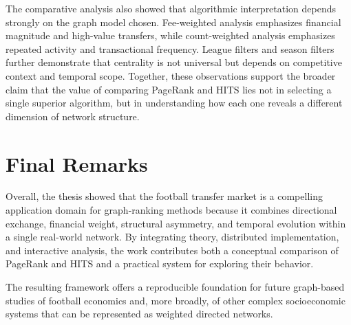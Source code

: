 The comparative analysis also showed that algorithmic interpretation depends strongly on the graph model chosen. Fee-weighted analysis emphasizes financial magnitude and high-value transfers, while count-weighted analysis emphasizes repeated activity and transactional frequency. League filters and season filters further demonstrate that centrality is not universal but depends on competitive context and temporal scope. Together, these observations support the broader claim that the value of comparing PageRank and HITS lies not in selecting a single superior algorithm, but in understanding how each one reveals a different dimension of network structure.

\section{Final Remarks}
\label{sec:conclusion_final}

Overall, the thesis showed that the football transfer market is a compelling application domain for graph-ranking methods because it combines directional exchange, financial weight, structural asymmetry, and temporal evolution within a single real-world network. By integrating theory, distributed implementation, and interactive analysis, the work contributes both a conceptual comparison of PageRank and HITS and a practical system for exploring their behavior.

The resulting framework offers a reproducible foundation for future graph-based studies of football economics and, more broadly, of other complex socioeconomic systems that can be represented as weighted directed networks.

